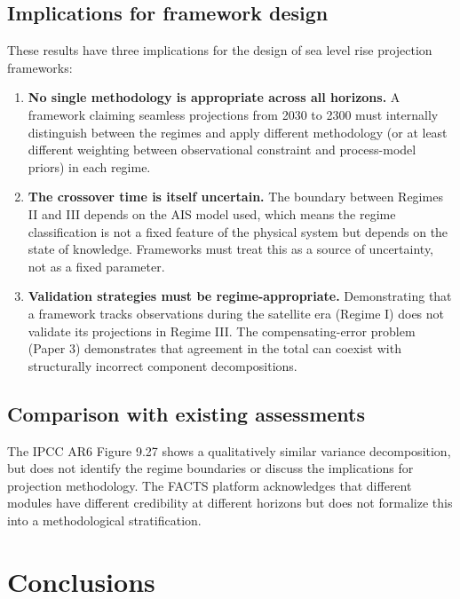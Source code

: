 \documentclass[11pt]{article}
\begin{document}
\subsection{Implications for framework design}

These results have three implications for the design of sea level rise projection frameworks:

\begin{enumerate}
  \item \textbf{No single methodology is appropriate across all horizons.}  A framework claiming seamless projections from 2030 to 2300 must internally distinguish between the regimes and apply different methodology (or at least different weighting between observational constraint and process-model priors) in each regime.

  \item \textbf{The crossover time is itself uncertain.}  The boundary between Regimes II and III depends on the AIS model used, which means the regime classification is not a fixed feature of the physical system but depends on the state of knowledge.  Frameworks must treat this as a source of uncertainty, not as a fixed parameter.

  \item \textbf{Validation strategies must be regime-appropriate.}  Demonstrating that a framework tracks observations during the satellite era (Regime I) does not validate its projections in Regime III.  The compensating-error problem (Paper 3) demonstrates that agreement in the total can coexist with structurally incorrect component decompositions.
\end{enumerate}

\subsection{Comparison with existing assessments}

The IPCC AR6 Figure 9.27 shows a qualitatively similar variance decomposition, but does not identify the regime boundaries or discuss the implications for projection methodology.  The FACTS platform \citep{kopp2023facts} acknowledges that different modules have different credibility at different horizons but does not formalize this into a methodological stratification.


\section{Conclusions}
\label{sec:conclusions}
\end{document}
